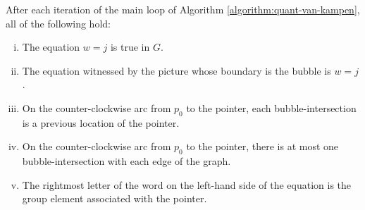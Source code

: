 \begin{lemma}\label{lemma:quant-van-kampen-induction}
	After each iteration of the main loop of Algorithm \ref{algorithm:quant-van-kampen}, all of the following hold:
\begin{enumerate}[(i)]
	\item The equation $w=j$ is true in $G$.
	\item\label{lemma:quant-van-kampen-induction-2} The equation witnessed by the picture whose boundary is the bubble is $w=j$.
	\item\label{lemma:quant-van-kampen-induction-3} On the counter-clockwise arc from $p_0$ to the pointer, each bubble-intersection is a previous location of the pointer.
	\item\label{lemma:quant-van-kampen-induction-4} On the counter-clockwise arc from $p_0$ to the pointer, there is at most one bubble-intersection with each edge of the graph.
	\item The rightmost letter of the word on the left-hand side of the equation is the group element associated with the pointer.
\end{enumerate}
\end{lemma}
